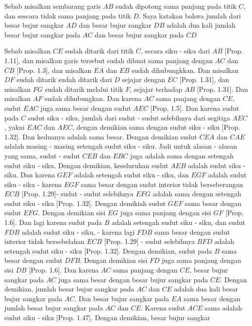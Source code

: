 \documentclass[a4paper]{book}
\begin{document}
Sebab misalkan sembarang garis $AB$ sudah dipotong sama panjang pada titik $C$,
dan sescara tidak sama panjang pada titik $D$. Saya katakan bahwa jumlah dari
besar bujur sangkar $AD$ dan besar bujur sangkar $DB$ adalah dua kali jumlah
besar bujur sangkar pada $AC$ dan besar bujur sangkar pada $CD$

Sebab misalkan $CE$ sudah ditarik dari titik $C$, secara siku - siku dari $AB$
[Prop. 1.11], dan misalkan garis tersebut sudah dibuat sama panjang dengan $AC$ 
dan $CB$ [Prop. 1.3], dan misalkan $EA$ dan $EB$ sudah dihubungkkan. Dan misalkan
$DF$ sudah ditarik sudah ditarik dari $D$ sejajar dengan $EC$ [Prop. 1.31], dan
misalkan $FG$ sudah ditarik melalui titik $F$, sejajar terhadap $AB$ [Prop. 1.31].
Dan misalkan $AF$ sudah dihubungkan. Dan karena $AC$ sama panjang dengan $CE$, 
sudut $EAC$ juga sama besar dengan sudut $AEC$ [Prop. 1.5]. Dan karena sudut 
pada $C$ sudut siku - siku, jumlah dari sudut - sudut selebihnya dari segitiga
$AEC$, yakni $EAC$ dan $AEC$, dengan demikian sama dengan sudut siku - siku
[Prop. 1.32]. Dan keduanya adalah sama besar. Dengan demikian sudut $CEA$ dan 
$CAE$ adalah masing - masing setengah sudut siku - siku. Jadi untuk alasan - 
alasan yang sama, sudut - sudut $CEB$ dan $EBC$ juga adalah sama dengan setengah
sudut siku - siku. Dengan demikian, keseluruhan sudut $AEB$ adalah sudut
siku - siku. Dan karena $GEF$ adalah setengah sudut siku - siku, dan $EGF$ 
adalah sudut  siku - siku - karena $EGF$ sama besar dengan sudut interior tidak
berseberangan $ECB$ [Prop. 1.29]- sudut - sudut selebihnya $EFG$ adalah sama
dengan setengah sudut siku - siku [Prop. 1.32[. Dengan demikiah sudut $GEF$
sama besar dengan sudut $EFG$. Dengan demikian sisi $EG$ juga sama panjang dengan
sisi $GF$ [Prop. 1.6]. Dan lagi karena sudut pada $B$ adalah setengah sudut
siku - siku, dan sudut $FDB$ adalah sudut siku - siku, - karena lagi $FDB$ 
sama besar dengan sudut interior tidak bersebelahan $ECB$ [Prop. 1.29] - sudut
selebihnya $BFD$ adalah setengah sudut siku - siku [Prop. 1.32]. Dengan demikian, sudut pada
$B$ sama besar dengan sudut $DFB$. Dengan demikian sisi $FD$ juga sama panjang 
dengan sisi $DB$ [Prop. 1.6]. Dan karena $AC$ sama panjang dengan $CE$, 
besar bujur sangkar pada $AC$ juga sama besar dengan besar bujur sangkar pada
$CE$. Dengan demikian, jumlah besar bujur sangkar pada $AC$ dan $CE$ adalah
dua kali besar bujur sangkar pada $AC$. Dan besar bujur sangkar pada $EA$ sama
besar dengan jumlah besar bujur sangkar pada $AC$ dan $CE$. Karena sudut $ACE$
sama adalah sudut siku - siku [Prop. 1.47]. Dengan demikian, besar bujur sangkar
\end{document}
